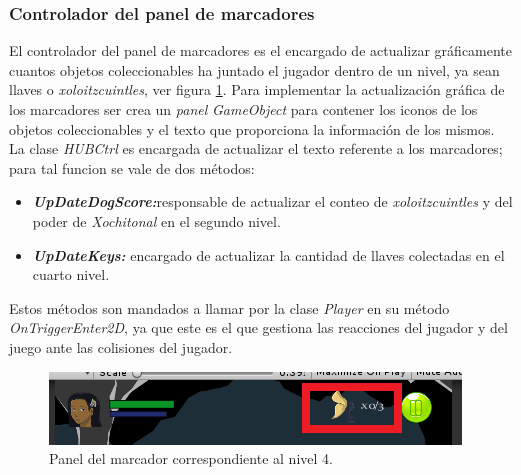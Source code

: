 \subsubsection{Controlador del panel de marcadores}
El controlador del panel de marcadores es el encargado de actualizar gráficamente cuantos objetos coleccionables ha juntado el jugador dentro de un nivel, ya sean llaves o \textit{xoloitzcuintles}, ver figura \ref{fig:HUB}. Para implementar la actualización gráfica de los marcadores ser crea un \textit{panel} \textit{GameObject} para contener los iconos de los objetos coleccionables y el texto que proporciona la información de los mismos. La clase \textit{HUBCtrl} es encargada de actualizar el texto referente a los marcadores; para tal funcion se vale de dos métodos:

	\begin{itemize}
		\item \textit{\textbf{UpDateDogScore:}}responsable de actualizar el conteo de \textit{xoloitzcuintles} y del poder de \textit{Xochitonal} en el segundo nivel.
		 \item \textit{\textbf{UpDateKeys:}} encargado de actualizar la cantidad de llaves colectadas en el cuarto nivel.
	\end{itemize}	 
	
	Estos métodos son mandados a llamar por la clase \textit{Player} en su método \textit{OnTriggerEnter2D}, ya que este es el que gestiona las reacciones del jugador y del juego ante las colisiones del jugador.

	\begin{figure}[h]
		\centering
		\includegraphics[height=0.05 \textheight]{03TrabajoRealizado/imagenes/HUB.png}
		\caption{Panel del marcador correspondiente al nivel 4.}
		\label{fig:HUB}
	\end{figure} 
	
